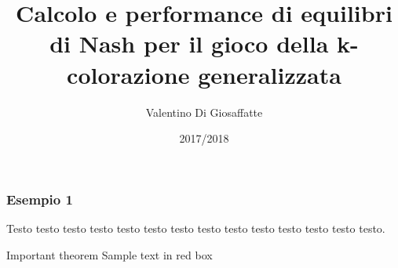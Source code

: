 \documentclass{beamer}
\title{Calcolo e performance di equilibri di Nash per il gioco della k-colorazione generalizzata}
\author{Valentino Di Giosaffatte}
\institute{Università degli Studi dell'Aquila}
\date{2017/2018}
\begin{document}
\frame{\titlepage}

\begin{frame}

\frametitle{Esempio 1}

Testo testo \alert{testo} testo testo testo testo testo testo testo testo testo testo testo.\\
 
\begin{alertblock}{Important theorem}
Sample text in red box
\end{alertblock}
 

\end{frame}
\end{document}
